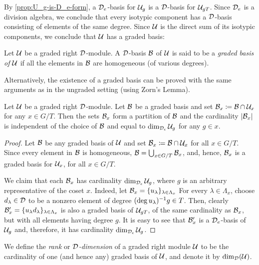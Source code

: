 By \cref{prop:U_g-is-D_e-form}, a $\mathcal{D}_e$-basis for $\mathcal U_g$ is a $\mathcal{D}$-basis for $\mathcal U_{gT}$. 
Since $\mathcal{D}_e$ is a division algebra, we conclude that every isotypic component has a $\mathcal{D}$-basis consisting of elements of the same degree. 
Since $\mathcal U$ is the direct sum of its isotypic components, we conclude that $\mathcal U$ has a graded basis:

\begin{defi}
    Let $\mathcal U$ be a graded right $\mathcal{D}$-module. 
    A $\mathcal{D}$-basis $\mathcal B$ of $\mathcal U$ is said to be a \emph{graded basis of $\mathcal U$} if all the elements in $\mathcal B$ are homogeneous (of various degrees).
\end{defi}

\begin{remark}
    Alternatively, the existence of a graded basis can be proved with the same arguments as in the ungraded setting (using Zorn's Lemma).
\end{remark}

\begin{prop}\label{prop:dim-U_x}
    Let $\mathcal U$ be a graded right $\mathcal{D}$-module. 
    Let $\mathcal B$ be a graded basis and set $\mathcal B_x \coloneqq \mathcal B \cap \mathcal U_x$ for any $x\in G/T$. 
    Then the sets $\mathcal B_x$ form a partition of $\mathcal B$ and the cardinality $|\mathcal B_x|$ is independent of the choice of $\mathcal B$ and equal to $\dim_{\mathcal{D}_e} \mathcal U_g$ for any $g\in x$. 
\end{prop}

\begin{proof}
    Let $\mathcal B$ be any graded basis of $\mathcal U$ and set $\mathcal B_x \coloneqq \mathcal B \cap \mathcal U_x$ for all $x\in G/T$. 
    Since every element in $\mathcal B$ is homogeneous, $\mathcal B = \bigcup_{x \in G/T} \mathcal B_x$, and, hence, $\mathcal B_x$ is a graded basis for $\mathcal U_x$, for all $x\in G/T$.
    
    We claim that each $\mathcal B_x$ has cardinality $\dim_{\mathcal{D}_e} \mathcal U_g$, where $g$ is an arbitrary representative of the coset $x$. 
    Indeed, let $\mathcal B_x = \{ u_\lambda\}_{\lambda \in \Lambda_x}$
    For every $\lambda \in \Lambda_x$, choose $d_\lambda \in \mathcal{D}$ to be a nonzero element of degree $(\deg u_\lambda)^{-1} g \in T$. 
    Then, clearly $\mathcal B_x' = \{u_\lambda d_\lambda \}_{\lambda \in \Lambda_x}$ is also a graded basis of $\mathcal U_{gT}$, of the same cardinality as $\mathcal B_x$, but with all elements having degree $g$. 
    It is easy to see that $\mathcal B_x'$ is a $\mathcal{D}_e$-basis of $\mathcal U_g$ and, therefore, it has cardinality $\dim_{\mathcal{D}_e} \mathcal U_g$. 
\end{proof}

\begin{defi}
    We define the \emph{rank} or \emph{$\mathcal{D}$-dimension} of a graded right module $\mathcal U$ to be the cardinality of one (and hence any) graded basis of $\mathcal U$, and denote it by $\dim_{\mathcal{D}} (\mathcal U)$.
\end{defi}

